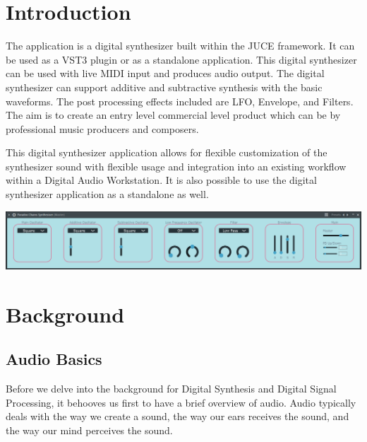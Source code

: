 \documentclass[a4paper,12pt]{report}
\begin{document}



\vspace*{\fill}
\begin{center}

\end{center}
\vfill
\thispagestyle{empty}
\newpage
\setcounter{page}{1}

\tableofcontents

\chapter{Introduction}
\label{chapter:intro}

The application is a digital synthesizer built within the JUCE framework. It can be used as a VST3 plugin or as a standalone application. This digital synthesizer can be used with live MIDI input and produces audio output. The digital synthesizer can support additive and subtractive synthesis with the basic waveforms. The post processing effects included are LFO, Envelope, and Filters. The aim is to create an entry level commercial level product which can be by professional music producers and composers.

This digital synthesizer application allows for flexible customization of the synthesizer sound with flexible usage and integration into an existing workflow within a Digital Audio Workstation. It is also possible to use the digital synthesizer application as a standalone as well.



\begin{center}
\includegraphics[width=36em]{OverallScreenshot.png}
\end{center}

\chapter{Background}
\label{chapter:background}
\section{Audio Basics}
\label{sec:audiobasics}
Before we delve into the background for Digital Synthesis and Digital Signal Processing, it behooves us first to have a brief overview of audio. Audio typically deals with the way we create a sound, the way our ears receives the sound, and the way our mind perceives the sound.
\end{document}
